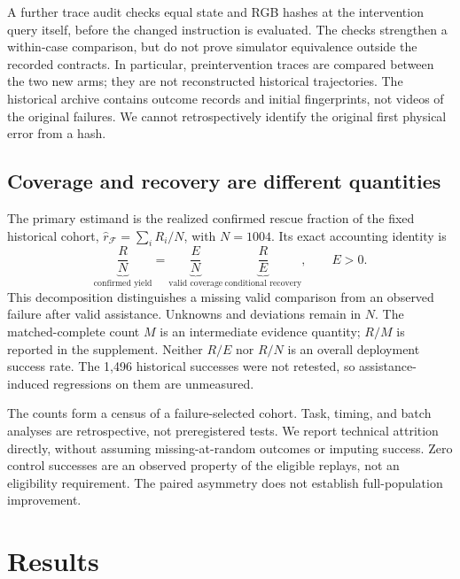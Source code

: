 \documentclass[10pt,twocolumn,letterpaper]{article}
\newcommand{\F}{\mathcal F}
\begin{document}
A further trace audit checks equal state and RGB hashes at the intervention query itself, before the changed instruction is evaluated. The checks strengthen a within-case comparison, but do not prove simulator equivalence outside the recorded contracts. In particular, preintervention traces are compared between the two new arms; they are not reconstructed historical trajectories. The historical archive contains outcome records and initial fingerprints, not videos of the original failures. We cannot retrospectively identify the original first physical error from a hash.

\subsection{Coverage and recovery are different quantities}
The primary estimand is the realized confirmed rescue fraction of the fixed historical cohort, $\widehat r_{\F}=\sum_iR_i/N$, with $N=1004$. Its exact accounting identity is
\begin{equation}
\underbrace{\frac{R}{N}}_{\text{confirmed yield}}
=\underbrace{\frac{E}{N}}_{\text{valid coverage}}\,
\underbrace{\frac{R}{E}}_{\text{conditional recovery}},\qquad E>0.
\label{eq:rates}
\end{equation}
This decomposition distinguishes a missing valid comparison from an observed failure after valid assistance. Unknowns and deviations remain in $N$. The matched-complete count $M$ is an intermediate evidence quantity; $R/M$ is reported in the supplement. Neither $R/E$ nor $R/N$ is an overall deployment success rate. The 1,496 historical successes were not retested, so assistance-induced regressions on them are unmeasured.

The counts form a census of a failure-selected cohort. Task, timing, and batch analyses are retrospective, not preregistered tests. We report technical attrition directly, without assuming missing-at-random outcomes or imputing success. Zero control successes are an observed property of the eligible replays, not an eligibility requirement. The paired asymmetry does not establish full-population improvement.

\section{Results}
\label{sec:results}
\end{document}
